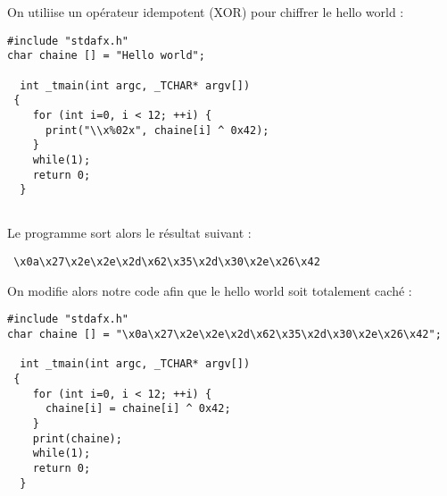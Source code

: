 \documentclass[a4paper,10pt]{article}
\begin{document}
On utiliise un opérateur idempotent (XOR) pour chiffrer le hello world : 

\begin{lstlisting}
#include "stdafx.h"
char chaine [] = "Hello world";

  int _tmain(int argc, _TCHAR* argv[])
 {
    for (int i=0, i < 12; ++i) {
      print("\\x%02x", chaine[i] ^ 0x42);
    }
    while(1);
    return 0;
  }
 
\end{lstlisting}

Le programme sort alors le résultat suivant : 
\begin{lstlisting}
 \x0a\x27\x2e\x2e\x2d\x62\x35\x2d\x30\x2e\x26\x42
\end{lstlisting}

On modifie alors notre code afin que le hello world soit totalement caché : 

\begin{lstlisting}
#include "stdafx.h"
char chaine [] = "\x0a\x27\x2e\x2e\x2d\x62\x35\x2d\x30\x2e\x26\x42";

  int _tmain(int argc, _TCHAR* argv[])
 {
    for (int i=0, i < 12; ++i) {
	  chaine[i] = chaine[i] ^ 0x42;
	}    
    print(chaine);
    while(1);
    return 0;
  }
 
\end{lstlisting}
\end{document}

